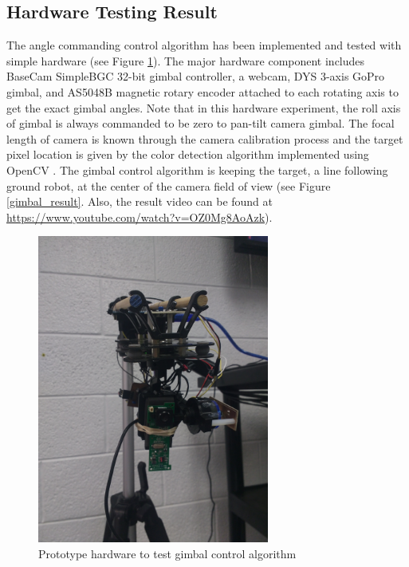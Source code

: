\subsection{Hardware Testing Result}
The angle commanding control algorithm has been implemented and tested with simple hardware (see Figure \ref{gimbal_webcam}). The major hardware component includes BaseCam SimpleBGC 32-bit gimbal controller, a webcam, DYS 3-axis GoPro gimbal, and AS5048B magnetic rotary encoder attached to each rotating axis to get the exact gimbal angles. Note that in this hardware experiment, the roll axis of gimbal is always commanded to be zero to pan-tilt camera gimbal. The focal length of camera is known through the camera calibration process and the target pixel location is given by the color detection algorithm implemented using OpenCV \cite{itseez2015opencv}. The gimbal control algorithm is keeping the target, a line following ground robot, at the center of the camera field of view (see Figure \ref{gimbal_result}. Also, the result video can be found at \href{https://www.youtube.com/watch?v=OZ0Mg8AoAzk}{https://www.youtube.com/watch?v=OZ0Mg8AoAzk}). 
\begin{figure}[t]
	\centering
	\includegraphics[width = 3in]{images/chapter2/gimbal_webcam.jpg}
	\caption{Prototype hardware to test gimbal control algorithm}
	\label{gimbal_webcam}
\end{figure}

